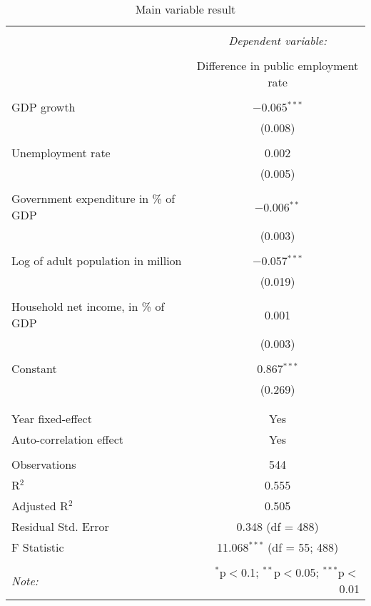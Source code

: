 
\begin{table}[!htbp] \centering 
  \caption{Main variable result} 
  \label{} 
\begin{tabular}{@{\extracolsep{5pt}}lc} 
\\[-1.8ex]\hline 
\hline \\[-1.8ex] 
 & \multicolumn{1}{c}{\textit{Dependent variable:}} \\ 
\cline{2-2} 
\\[-1.8ex] & Difference in public employment rate \\ 
\hline \\[-1.8ex] 
 GDP growth & $-$0.065$^{***}$ \\ 
  & (0.008) \\ 
  & \\ 
 Unemployment rate & 0.002 \\ 
  & (0.005) \\ 
  & \\ 
 Government expenditure in \% of GDP & $-$0.006$^{**}$ \\ 
  & (0.003) \\ 
  & \\ 
 Log of adult population in million & $-$0.057$^{***}$ \\ 
  & (0.019) \\ 
  & \\ 
 Household net income, in \% of GDP & 0.001 \\ 
  & (0.003) \\ 
  & \\ 
 Constant & 0.867$^{***}$ \\ 
  & (0.269) \\ 
  & \\ 
\hline \\[-1.8ex] 
Year fixed-effect & Yes \\ 
Auto-correlation effect & Yes \\ 
\hline \\[-1.8ex] 
Observations & 544 \\ 
R$^{2}$ & 0.555 \\ 
Adjusted R$^{2}$ & 0.505 \\ 
Residual Std. Error & 0.348 (df = 488) \\ 
F Statistic & 11.068$^{***}$ (df = 55; 488) \\ 
\hline 
\hline \\[-1.8ex] 
\textit{Note:}  & \multicolumn{1}{r}{$^{*}$p$<$0.1; $^{**}$p$<$0.05; $^{***}$p$<$0.01} \\ 
\end{tabular} 
\end{table} 
